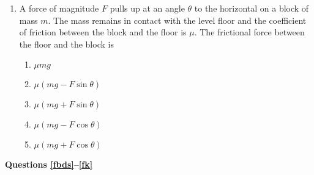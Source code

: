 \documentclass{../../oss-apphys}
\begin{document}
\begin{multicols}{2}
\begin{enumerate}[resume,leftmargin=18pt]
  \item A force of magnitude $F$ pulls up at an angle $\theta$ to the
    horizontal on a block of mass $m$. The mass remains in contact with the
    level floor and the coefficient of friction between the block and the floor
    is $\mu$. The frictional force between the floor and the block is
    \begin{center}
    \end{center}
    \begin{enumerate}[noitemsep,topsep=0pt,leftmargin=18pt,label=(\Alph*)]
    \item$\mu mg$
    \item$\mu (mg-F\sin\theta)$
    \item$\mu (mg+F\sin\theta)$
    \item$\mu (mg-F\cos\theta)$
    \item$\mu (mg+F\cos\theta)$
    \end{enumerate}    
  \end{enumerate}
  \columnbreak
  
  \textbf{Questions \ref{fbds}--\ref{fk}}


\end{multicols}
\end{document}
